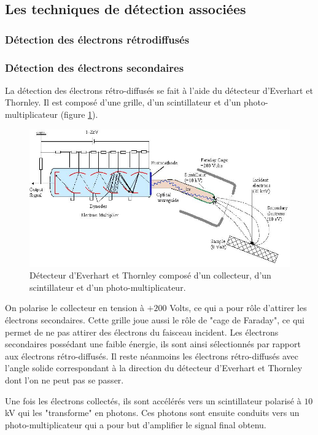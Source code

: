 \documentclass[a4paper,12pt]{article}
\newcommand\ett{Everhart et Thornley\xspace}
\begin{document}
\subsection{Les techniques de détection associées}

\subsubsection*{Détection des électrons rétrodiffusés}

\subsubsection*{Détection des électrons secondaires}

La détection des électrons rétro-diffusés se fait à l'aide du détecteur d'\ett. Il est composé d'une grille, d'un scintillateur et d'un photo-multiplicateur (figure \ref{fig:detect_ett}).

\begin{figure}
\centering
\includegraphics[width = 0.9 \textwidth]{images/detect_ett.png}
\caption{Détecteur d'\ett composé d'un collecteur, d'un scintillateur et d'un photo-multiplicateur.}
\label{fig:detect_ett}
\end{figure}
 
On polarise le collecteur en tension à $+200$ Volts, ce qui a pour rôle d'attirer les électrons secondaires. 
Cette grille joue aussi le rôle de "cage de Faraday", ce qui permet de ne pas attirer des électrons du faisceau incident. 
Les électrons secondaires possédant une faible énergie, ils sont ainsi sélectionnés par rapport aux électrons rétro-diffusés.
Il reste néanmoins les électrons rétro-diffusés avec l'angle solide correspondant à la direction du détecteur d'\ett dont l'on ne peut pas se passer.

Une fois les électrons collectés, ils sont accélérés vers un scintillateur polarisé à $10$kV qui les "transforme" en photons.
Ces photons sont ensuite conduits vers un photo-multiplicateur qui a pour but d'amplifier le signal final obtenu.
\end{document}
